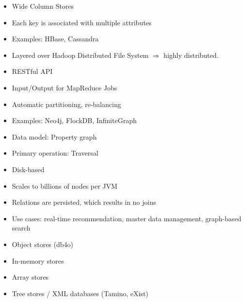 \begin{breakbox}
\begin{itemize}
	\item Wide Column Stores
	\item Each key is associated with multiple attributes
	\item Examples: HBase, Cassandra
\end{itemize}
\end{breakbox}

\begin{breakbox}
\begin{itemize}
	\item Layered over Hadoop Distributed File System $\Rightarrow$ highly distributed.
	\item RESTful API
	\item Input/Output for MapReduce Jobs
	\item Automatic partitioning, re-balancing
\end{itemize}
\end{breakbox}

\begin{breakbox}
\begin{itemize}
	\item Examples: Neo4j, FlockDB, InfiniteGraph
\end{itemize}
\end{breakbox}

\begin{breakbox}
\begin{itemize}
	\item Data model: Property graph
	\item Primary operation: Traversal
	\item Disk-based
	\item Scales to billions of nodes per JVM
	\item Relations are persisted, which results in no joins
\end{itemize}

\begin{itemize}
	\item Use cases: real-time recommendation, master data management, graph-based search
\end{itemize}
\end{breakbox}

\begin{breakbox}
\begin{itemize}
	\item Object stores (db4o)
	\item In-memory stores
	\item Array stores
	\item Tree stores / XML databases (Tamino, eXist)
\end{itemize}
\end{breakbox}

